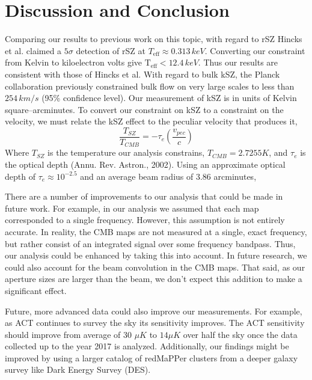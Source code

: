 \documentclass{princeton_astro_thesis}
\begin{document}
\chapter{Discussion and Conclusion}
\par Comparing our results to previous work on this topic, with regard to rSZ Hincks et al. claimed a $5\sigma$ detection of rSZ at $T_\mathrm{eff}\approx 0.313\, keV$. Converting our constraint from Kelvin to kiloelectron volts give $\mathrm{T_{eff}}<12.4 \, keV$. Thus our results are consistent with those of Hincks et al. With regard to bulk kSZ, the Planck collaboration previously constrained bulk flow on very large scales to less than $254\, km/s$ (95\% confidence level). Our measurement of kSZ is in units of Kelvin square--arcminutes. To convert our constraint on kSZ to a constraint on the velocity, we must relate the kSZ effect to the peculiar velocity that produces it,
\begin{equation}
\frac{T_{SZ}}{T_{CMB}}=-\tau_e\left(\frac{v_{pec}}{c}\right)
\end{equation}
Where $T_{SZ}$ is the temperature our analysis constrains, $T_{CMB}=2.7255 K$, and $\tau_e$ is the optical depth (Annu. Rev. Astron., 2002). Using an approximate optical depth of $\tau_e\approx10^{-2.5}$ and an average beam radius of $3.86$ arcminutes, 
\par There are a number of improvements to our analysis that could be made in future work. For example, in our analysis we assumed that each map corresponded to a single frequency. However, this assumption is not entirely accurate. In reality, the CMB maps are not measured at a single, exact frequency, but rather consist of an integrated signal over some frequency bandpass. Thus, our analysis could be enhanced by taking this into account. In future research, we could also account for the beam convolution in the CMB maps. That said, as our aperture sizes are larger than the beam, we don't expect this addition to make a significant effect.
\par Future, more advanced data could also improve our measurements. For example, as ACT continues to survey the sky its sensitivity improves. The ACT sensitivity should improve from average of 30 $\mu K$ to $14 \mu K$ over half the sky once the data collected up to the year 2017 is analyzed. Additionally, our findings might be improved by using a larger catalog of redMaPPer clusters from a deeper galaxy survey like Dark Energy Survey (DES).
\end{document}
